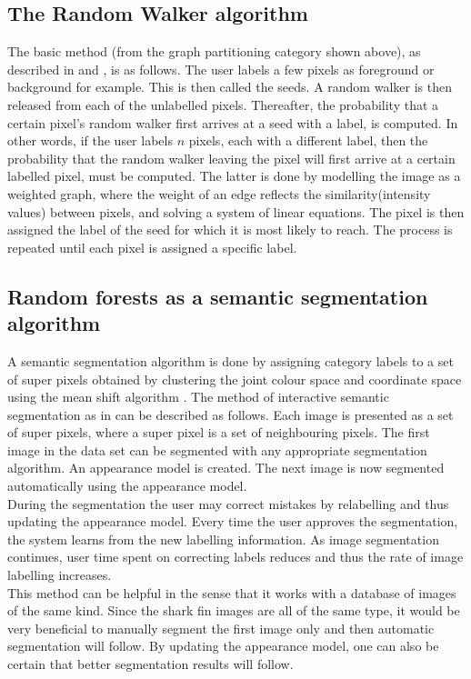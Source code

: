 \documentclass[a4paper,10pt]{article}
\begin{document}
\subsection{The Random Walker algorithm}
The basic method (from the graph partitioning category shown above), as
described in \cite{rw} and \cite{rw1}, is as follows.  The user labels a few
pixels as foreground or background for example.  This is then called the seeds. 
A random walker is then released from each of the unlabelled pixels. 
Thereafter, the probability that a certain pixel's random walker first arrives
at a seed with a label, is computed.  In other words, if the user labels $n$
pixels, each with a different label, then the probability that the random walker
leaving the pixel will first arrive at a certain labelled pixel, must be
computed.  The latter is done by modelling the image as a weighted graph, where
the weight of an edge reflects the similarity(intensity values) between pixels,
and solving a system of linear equations.  The pixel is then assigned the label
of the seed for which it is most likely to reach.  The process is repeated until
each pixel is assigned a specific label. 

\subsection{Random forests as a semantic segmentation algorithm}
A semantic segmentation algorithm is done by assigning category labels to a set
of super pixels obtained by clustering the joint colour space and coordinate
space using the mean shift algorithm \cite{ms}.
The method of interactive semantic segmentation as in \cite{RF} can be described
as follows.  Each image is presented as a set of super pixels, where a super
pixel is a set of neighbouring pixels.  The first image in the data set can be
segmented with any appropriate segmentation algorithm.  An appearance model is
created.  The next image is now segmented automatically using the appearance
model. \\  

\noindent During the segmentation the user may correct mistakes by relabelling
and thus updating the appearance model.  Every time the user approves the
segmentation, the system learns from the new labelling information. As image
segmentation continues, user time spent on correcting labels reduces and thus
the rate of image labelling increases.  \\

\noindent This method can be helpful in the sense that it works with a database
of images of the same kind.  Since the shark fin images are all of the same
type, it would be very beneficial to manually segment the first image only and
then automatic segmentation will follow.  By updating the appearance model, one
can also be certain that better segmentation results will follow.  \\  
\end{document}
